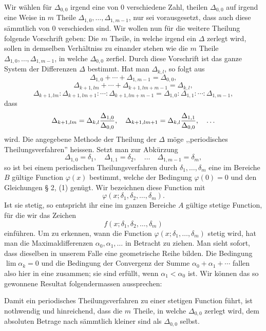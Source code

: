 \documentclass[11pt,a4paper]{article}
\begin{document}
Wir wählen für $\Delta_{0,0}$ irgend eine von $0$ verschiedene Zahl, theilen $\Delta_{0,0}$ auf irgend eine Weise in $m$ Theile $\Delta_{1,0},\ldots,\Delta_{1,m-1}$, nur sei vorausgesetzt, dass auch diese sämmtlich von $0$ verschieden sind. Wir wollen nun für die weitere Theilung folgende Vorschrift geben: Die $m$ Theile, in welche irgend ein $\Delta$ zerlegt wird, sollen in demselben Verhältniss zu einander stehen wie die $m$ Theile $\Delta_{1,0},\ldots,\Delta_{1,m-1}$, in welche $\Delta_{0,0}$ zerfiel. Durch diese Vorschrift ist das ganze System der Differenzen $\Delta$ bestimmt. Hat man $\Delta_{k,l}$, so folgt aus
\[
 \Delta_{1,0}+\cdots+\Delta_{1,m-1}=\Delta_{0,0},
\]
\[
 \Delta_{k+1,lm}+\cdots+\Delta_{k+1,lm+m-1}=\Delta_{k,l},
\]
\[
 \Delta_{k+1,lm}:\Delta_{k+1,lm+1}:\cdots:\Delta_{k+1,lm+m-1}
 =\Delta_{1,0}:\Delta_{1,1}:\cdots:\Delta_{1,m-1},
\]
dass
\[
 \Delta_{k+1,lm}=\Delta_{k,l}{\Delta_{1,0}\over\Delta_{0,0}},
 \quad
 \Delta_{k+1,lm+1}=\Delta_{k,l}{\Delta_{1,1}\over\Delta_{0,0}},
 \quad\ldots
\]
wird. Die angegebene Methode der Theilung der $\Delta$ möge ,,periodisches Theilungsverfahren'' heissen. Setzt man zur Abkürzung
\[
 \Delta_{1,0}=\delta_1,
 \quad
 \Delta_{1,1}=\delta_2,
 \quad\ldots\quad
 \Delta_{1,m-1}=\delta_m,
\]
so ist bei einem periodischen Theilungsverfahren durch $\delta_1,\ldots,\delta_m$ eine im Bereiche $B$ gültige Function $\varphi(x)$ bestimmt, welche der Bedingung $\varphi(0)=0$ und den Gleichungen § 2, (1) genügt. Wir bezeichnen diese Function mit
\[
 \varphi(x;\delta_1,\delta_2,\ldots,\delta_m).
\]
Ist sie stetig, so entspricht ihr eine im ganzen Bereiche $A$ gültige stetige Function, für die wir das Zeichen
\[
 f(x;\delta_1,\delta_2,\ldots,\delta_m)
\]
einführen. Um zu erkennen, wann die Function $\varphi(x;\delta_1,\ldots,\delta_m)$ stetig wird, hat man die Maximaldifferenzen $\alpha_0,\alpha_1,\ldots$ in Betracht zu ziehen. Man sieht sofort, dass dieselben in unserem Falle eine geometrische Reihe bilden. Die Bedingung $\lim\alpha_k=0$ und die Bedingung der Convergenz der Summe $\alpha_0+\alpha_1+\cdots$ fallen also hier in eine zusammen; sie sind erfüllt, wenn $\alpha_1<\alpha_0$ ist. Wir können das so gewonnene Resultat folgendermassen aussprechen:

Damit ein periodisches Theilungsverfahren zu einer stetigen Function führt, ist nothwendig und hinreichend, dass die $m$ Theile, in welche $\Delta_{0,0}$ zerlegt wird, dem absoluten Betrage nach sämmtlich kleiner sind als $\Delta_{0,0}$ selbst.
\end{document}
